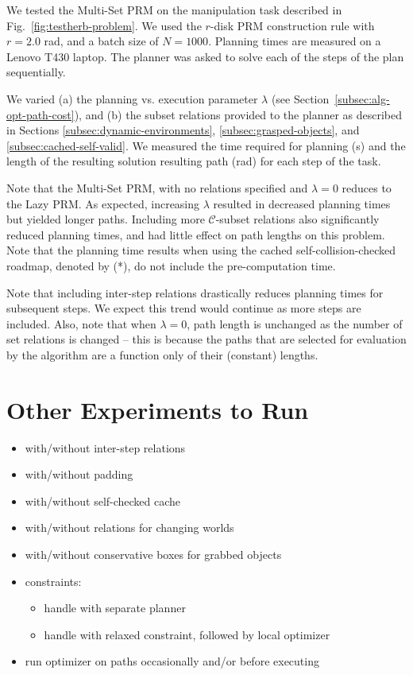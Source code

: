 We tested the Multi-Set PRM on the manipulation task
described in Fig.~\ref{fig:testherb-problem}.
We used the $r$-disk PRM construction rule with $r=2.0$ rad,
and a batch size of $N=1000$.
Planning times are measured on a Lenovo T430 laptop.
The planner was asked to solve each of the steps of the plan
sequentially.

We varied
(a) the planning vs. execution parameter $\lambda$
(see Section~\ref{subsec:alg-opt-path-cost}), and
(b) the subset relations provided to the planner
as described in Sections
\ref{subsec:dynamic-environments},
\ref{subsec:grasped-objects},
and \ref{subsec:cached-self-valid}.
We measured the time required for planning (s)
and the length of the resulting solution resulting path (rad)
for each step of the task.

Note that the Multi-Set PRM,
with no relations specified and $\lambda=0$
reduces to the Lazy PRM.
As expected,
increasing $\lambda$ resulted in decreased planning times
but yielded longer paths.
Including more $\mathcal{C}$-subset relations
also significantly reduced planning times,
and had little effect on path lengths on this problem.
Note that the planning time results when using
the cached self-collision-checked roadmap, denoted by (*),
do not include the pre-computation time.

Note that including inter-step relations drastically
reduces planning times for subsequent steps.
We expect this trend would continue as more steps are included.
Also, note that when $\lambda=0$,
path length is unchanged as the number of set relations is
changed
-- this is because the paths that are selected for evaluation
by the algorithm are a function only of their (constant) lengths.

\section{Other Experiments to Run}

\begin{itemize}
\item with/without inter-step relations
\item with/without padding
\item with/without self-checked cache
\item with/without relations for changing worlds
\item with/without conservative boxes for grabbed objects
\item constraints:
   \begin{itemize}
   \item handle with separate planner
   \item handle with relaxed constraint, followed by local optimizer
   \end{itemize}
\item run optimizer on paths occasionally and/or before executing
\end{itemize}
